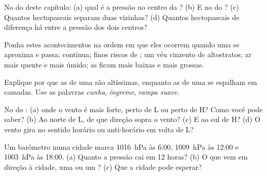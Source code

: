 \begin{exercise}[$\star$]\label{exo:g8:fronts-and-weather-maps:4}
No  do  deste capítulo: (a) qual é a pressão no centro da
? (b) E no do ? (c) Quantos hectopascais separam duas
 vizinhas? (d) Quantos hectopascais de diferença há entre a
pressão dos dois centros?
\end{exercise}

\begin{exercise}[$\star\star$]\label{exo:g8:fronts-and-weather-maps:5}
Ponha estes acontecimentos na ordem em que eles ocorrem quando uma  se aproxima e passa:  contínua; finos riscos de ; um véu
cinzento de altostratos; ar mais quente e mais úmido; as  ficam mais
baixas e mais grossas.
\end{exercise}

\begin{exercise}[$\star\star$]\label{exo:g8:fronts-and-weather-maps:6}
Explique por que as  de uma  são altíssimas, enquanto as
de uma  se espalham em camadas. Use as palavras \emph{cunha},
\emph{íngreme}, \emph{rampa suave}.
\end{exercise}

\begin{exercise}[$\star\star$]\label{exo:g8:fronts-and-weather-maps:7}
No  do : (a) onde o vento é mais forte, perto de L ou perto de H?
Como você pode saber? (b) Ao norte de L, de que direção sopra o vento?
(c) E ao sul de H? (d) O vento gira no sentido horário ou anti-horário em
volta de L?
\end{exercise}

\begin{exercise}[$\star\star$]\label{exo:g8:fronts-and-weather-maps:8}
Um barômetro numa cidade marca \qty{1016}{hPa} às 6:00, \qty{1009}{hPa} às
12:00 e \qty{1003}{hPa} às 18:00. (a) Quanto a pressão cai em 12 horas?
(b) O que vem em direção à cidade, uma  ou um ? (c) Que
 a cidade pode esperar?
\end{exercise}


